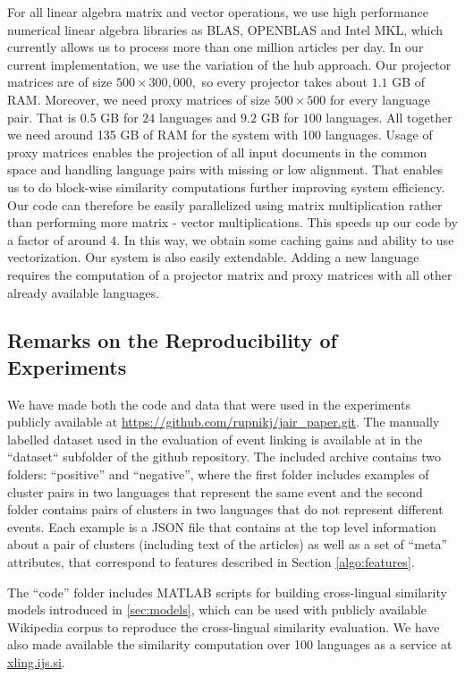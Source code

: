\documentclass[twoside,11pt]{article}
\begin{document}
For all linear algebra matrix and vector operations, we use high performance numerical linear algebra libraries as BLAS, OPENBLAS and Intel MKL, which currently allows us to process more than one million articles per day.
In our current implementation, we use the variation of the hub approach. Our projector matrices are of size $500\times 300,000,$ so every projector takes about $1.1$ GB of RAM. Moreover, we need proxy matrices of size $500\times500$ for every language pair. That is 0.5 GB for $24$ languages and $9.2$ GB for $100$ languages. All together we need around 135 GB of RAM for the system with 100 languages.
 Usage of proxy matrices enables the projection of all input documents in the common space and handling language pairs with missing or low alignment. That enables us to do block-wise similarity computations further improving system efficiency. Our code can therefore be easily parallelized using matrix multiplication rather than performing more matrix - vector multiplications. This speeds up our code by a factor of around $4.$ In this way, we obtain some caching gains and ability to use vectorization.
Our system is also easily extendable. Adding a new language requires the  computation of  a projector matrix and proxy matrices with all other already available languages.

\subsection{Remarks on the Reproducibility of Experiments}
We have made  both the code and data that were used in the experiments publicly available at \url{https://github.com/rupnikj/jair_paper.git}.
The manually labelled dataset used in the evaluation of event linking is available at in the ``dataset`` subfolder of the github repository. The included archive contains two folders: ``positive'' and ``negative'', where the first folder includes examples of cluster pairs in two languages that represent the same event and the second folder contains pairs of clusters in two languages that do not represent different events. Each example is a JSON file that contains at the top level information about a pair of clusters (including text of the articles) as well as a set of ``meta'' attributes, that correspond to features described in Section \ref{algo:features}.

The ``code'' folder includes MATLAB scripts for building cross-lingual similarity models introduced in \ref{sec:models}, which can be used with publicly available Wikipedia corpus to reproduce the cross-lingual similarity evaluation. We have also made available the similarity computation over 100 languages as a service at \url{xling.ijs.si}.
\end{document}

